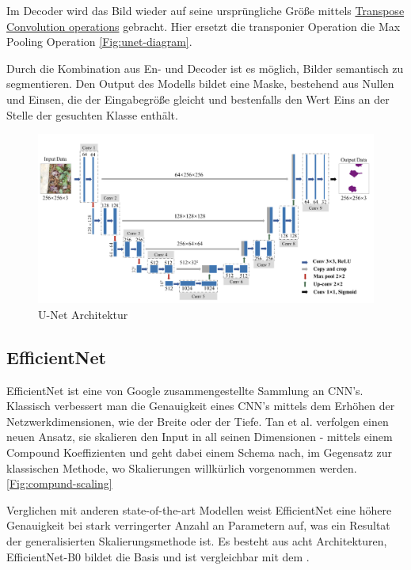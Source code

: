 Im Decoder wird das Bild wieder auf seine ursprüngliche Größe mittels 
\href{https://en.wikipedia.org/wiki/Deconvolution}{Transpose Convolution operations}
gebracht. Hier ersetzt die transponier Operation die Max Pooling Operation \autoref{Fig:unet-diagram}. 

Durch die Kombination aus En- und Decoder ist es möglich, Bilder semantisch zu segmentieren. Den Output des Modells bildet eine Maske, bestehend aus Nullen und Einsen, die der Eingabegröße gleicht und bestenfalls den Wert Eins an der Stelle der gesuchten Klasse enthält.

\begin{figure}[H]
	\begin{center}
		\includegraphics[width=430pt]{bilder/u-net-architecture}
		\caption{U-Net Architektur \citet{Zhang:2020}}\label{Fig:unet-diagram}
	\end{center}
\end{figure}


\subsection{EfficientNet}
EfficientNet ist eine von Google zusammengestellte Sammlung an CNN's. Klassisch verbessert man die Genauigkeit eines CNN's mittels dem Erhöhen der Netzwerkdimensionen, wie der Breite oder der Tiefe. Tan et al. verfolgen einen neuen Ansatz, sie skalieren den Input in all seinen Dimensionen - mittels einem Compound Koeffizienten und geht dabei einem Schema nach, im Gegensatz zur klassischen Methode, wo Skalierungen willkürlich vorgenommen werden. \autoref{Fig:compund-scaling}

Verglichen mit anderen state-of-the-art Modellen weist EfficientNet eine höhere Genauigkeit bei stark verringerter Anzahl an Parametern auf, was ein Resultat der generalisierten Skalierungsmethode ist. Es besteht aus acht Architekturen, EfficientNet-B0 bildet die Basis und ist vergleichbar mit dem \citet{MobileNetV2}.


